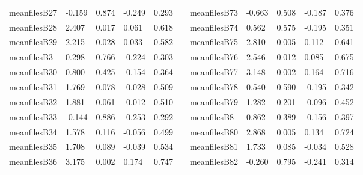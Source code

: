 \begin{table}[h!]
\begin{tabular}{lllllllllll}
meanfilesB27  & -0.159           & 0.874            & -0.249              & 0.293               &           & meanfilesB73  & -0.663           & 0.508            & -0.187              & 0.376               \\
meanfilesB28  & 2.407            & 0.017            & 0.061               & 0.618               &           & meanfilesB74  & 0.562            & 0.575            & -0.195              & 0.351               \\
meanfilesB29  & 2.215            & 0.028            & 0.033               & 0.582               &           & meanfilesB75  & 2.810            & 0.005            & 0.112               & 0.641               \\
meanfilesB3   & 0.298            & 0.766            & -0.224              & 0.303               &           & meanfilesB76  & 2.546            & 0.012            & 0.085               & 0.675               \\
meanfilesB30  & 0.800            & 0.425            & -0.154              & 0.364               &           & meanfilesB77  & 3.148            & 0.002            & 0.164               & 0.716               \\
meanfilesB31  & 1.769            & 0.078            & -0.028              & 0.509               &           & meanfilesB78  & 0.540            & 0.590            & -0.195              & 0.342               \\
meanfilesB32  & 1.881            & 0.061            & -0.012              & 0.510               &           & meanfilesB79  & 1.282            & 0.201            & -0.096              & 0.452               \\
meanfilesB33  & -0.144           & 0.886            & -0.253              & 0.292               &           & meanfilesB8   & 0.862            & 0.389            & -0.156              & 0.397               \\
meanfilesB34  & 1.578            & 0.116            & -0.056              & 0.499               &           & meanfilesB80  & 2.868            & 0.005            & 0.134               & 0.724               \\
meanfilesB35  & 1.708            & 0.089            & -0.039              & 0.534               &           & meanfilesB81  & 1.733            & 0.085            & -0.034              & 0.528               \\
meanfilesB36  & 3.175            & 0.002            & 0.174               & 0.747               &           & meanfilesB82  & -0.260           & 0.795            & -0.241              & 0.314               \\

\end{tabular}
\end{table}
